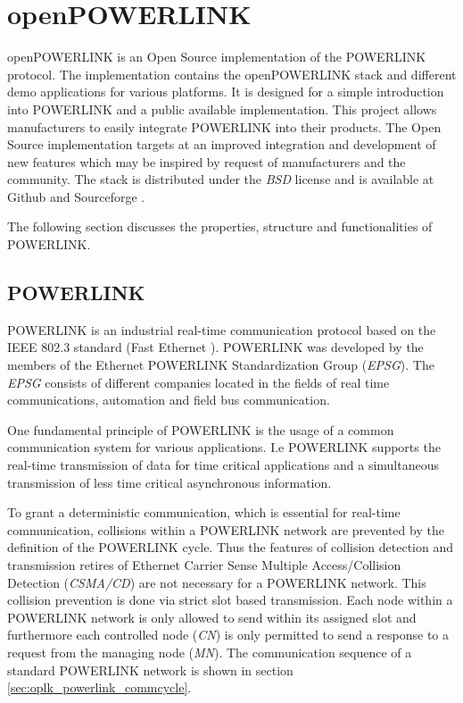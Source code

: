 \chapter{openPOWERLINK}
\label{cha:oplk}
openPOWERLINK is an Open Source implementation of the POWERLINK protocol.
The implementation contains the openPOWERLINK stack and different demo applications for various platforms.
It is designed for a simple introduction into POWERLINK and a public available implementation.
This project allows manufacturers to easily integrate POWERLINK into their products.
The Open Source implementation targets at an improved integration and development of new features which may be inspired by request of manufacturers and the community.
The stack is distributed under the \emph{BSD} license and is available at Github \cite{openpowerlink_github} and Sourceforge \cite{openpowerlink_sourceforge}.

The following section discusses the properties, structure and functionalities of POWERLINK.

\section{POWERLINK}
\label{sec:oplk_powerlink}
POWERLINK is an industrial real-time communication protocol based on the IEEE 802.3 standard (Fast Ethernet \cite{ethernet_ieee_2016}).
POWERLINK was developed by the members of the Ethernet POWERLINK Standardization Group (\emph{EPSG}).
The \emph{EPSG} consists of different companies located in the fields of real time communications, automation and field bus communication. \cite{epsg_hp}

One fundamental principle of POWERLINK is the usage of a common communication system for various applications.
I.e POWERLINK supports the real-time transmission of data for time critical applications and a simultaneous transmission of less time critical asynchronous information.

To grant a deterministic communication, which is essential for real-time communication, collisions within a POWERLINK network are prevented by the definition of the POWERLINK cycle.
Thus the features of collision detection and transmission retires of Ethernet Carrier Sense Multiple Access/Collision Detection (\emph{CSMA/CD}) are not necessary for a POWERLINK network. \cite[section 4.2]{ethernet_ieee_2016}
This collision prevention is done via strict slot based transmission.
Each node within a POWERLINK network is only allowed to send within its assigned slot and furthermore each controlled node (\emph{CN}) is only permitted to send a response to a request from the managing node (\emph{MN}). \cite[chapter 1]{epsg_epsg_2013}
The communication sequence of a standard POWERLINK network is shown in section \ref{sec:oplk_powerlink_commcycle}.


